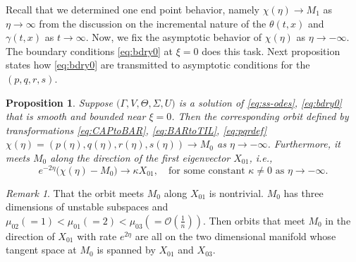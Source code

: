 \documentclass[a4paper,11pt]{article}
\def\BO{{\mathcal{O}}}
\newtheorem{proposition}{Proposition}[section]
\theoremstyle{remark}
\newtheorem{remark}{Remark}[section]
\begin{document}
Recall that we determined one end point behavior, namely $\chi(\eta) \rightarrow M_1$ as $\eta \rightarrow \infty$ from the discussion on the incremental nature of the $\theta(t,x)$ and $\gamma(t,x)$ as $t \rightarrow \infty$. Now, we fix the asymptotic behavior of $\chi(\eta)$ as $\eta \rightarrow -\infty$. The boundary conditions \eqref{eq:bdry0} at $\xi=0$ does this task. Next proposition states how \eqref{eq:bdry0} are transmitted to asymptotic conditions for the $(p,q,r,s)$.

\begin{proposition} \label{prop1}
    Suppose $\big(\Gamma,V,\Theta,\Sigma,U\big)$ is a solution of \eqref{eq:ss-odes}, \eqref{eq:bdry0} that is smooth and bounded near $\xi=0$. Then the corresponding orbit defined by transformations \eqref{eq:CAPtoBAR}, \eqref{eq:BARtoTIL}, \eqref{eq:pqrdef} $\chi(\eta) = (p(\eta), q(\eta), r(\eta),s(\eta)) \rightarrow M_0$ as $\eta \rightarrow -\infty$. Furthermore, it meets $M_0$ along the direction of the first eigenvector $X_{01}$, i.e.,
    \begin{equation} \label{eq:alpha}
     e^{-2\eta}\big(\chi(\eta) - M_0 \big) \rightarrow \kappa X_{01}, \quad \text{for some constant $\kappa\ne0$ as $\eta \rightarrow -\infty$.}
    \end{equation}
\end{proposition}
\begin{remark} \label{rem:alpha}
  That the orbit meets $M_0$ along $X_{01}$ is nontrivial. $M_0$ has three dimensions of unstable subspaces and $\mu_{02}(=1)<\mu_{01}(=2)<\mu_{03}(=\BO(\frac{1}{n}))$. %
  Then orbits that meet $M_0$ in the direction of $X_{01}$ with rate $e^{2\eta}$ are all on the two dimensional manifold whose tangent space at $M_0$ is spanned by $X_{01}$ and $X_{03}$.
%
%
%

%
%
%
\end{remark}
\end{document}
